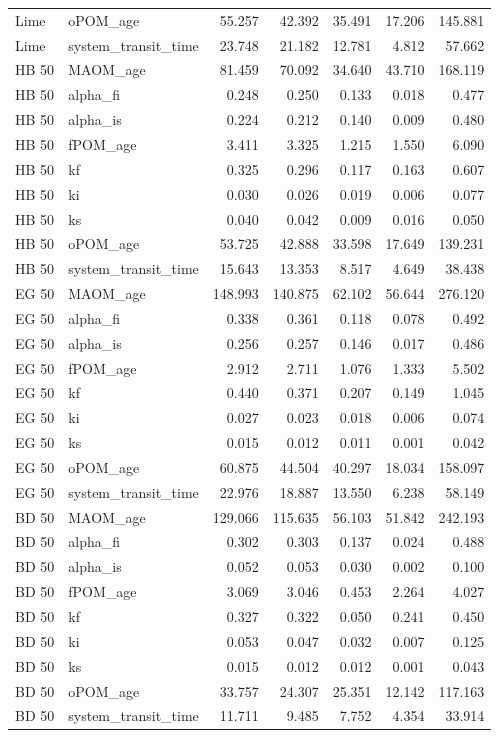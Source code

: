 \documentclass[preprint,12pt]{elsarticle}
\begin{document}
\begin{landscape}
\begin{longtable}{llrrrrr}
Lime & oPOM\_age & 55.257 & 42.392 & 35.491 & 17.206 & 145.881 \\
Lime & system\_transit\_time & 23.748 & 21.182 & 12.781 & 4.812 & 57.662 \\
HB 50 & MAOM\_age & 81.459 & 70.092 & 34.640 & 43.710 & 168.119 \\
HB 50 & alpha\_fi & 0.248 & 0.250 & 0.133 & 0.018 & 0.477 \\
HB 50 & alpha\_is & 0.224 & 0.212 & 0.140 & 0.009 & 0.480 \\
HB 50 & fPOM\_age & 3.411 & 3.325 & 1.215 & 1.550 & 6.090 \\
HB 50 & kf & 0.325 & 0.296 & 0.117 & 0.163 & 0.607 \\
HB 50 & ki & 0.030 & 0.026 & 0.019 & 0.006 & 0.077 \\
HB 50 & ks & 0.040 & 0.042 & 0.009 & 0.016 & 0.050 \\
HB 50 & oPOM\_age & 53.725 & 42.888 & 33.598 & 17.649 & 139.231 \\
HB 50 & system\_transit\_time & 15.643 & 13.353 & 8.517 & 4.649 & 38.438 \\
EG 50 & MAOM\_age & 148.993 & 140.875 & 62.102 & 56.644 & 276.120 \\
EG 50 & alpha\_fi & 0.338 & 0.361 & 0.118 & 0.078 & 0.492 \\
EG 50 & alpha\_is & 0.256 & 0.257 & 0.146 & 0.017 & 0.486 \\
EG 50 & fPOM\_age & 2.912 & 2.711 & 1.076 & 1.333 & 5.502 \\
EG 50 & kf & 0.440 & 0.371 & 0.207 & 0.149 & 1.045 \\
EG 50 & ki & 0.027 & 0.023 & 0.018 & 0.006 & 0.074 \\
EG 50 & ks & 0.015 & 0.012 & 0.011 & 0.001 & 0.042 \\
EG 50 & oPOM\_age & 60.875 & 44.504 & 40.297 & 18.034 & 158.097 \\
EG 50 & system\_transit\_time & 22.976 & 18.887 & 13.550 & 6.238 & 58.149 \\
BD 50 & MAOM\_age & 129.066 & 115.635 & 56.103 & 51.842 & 242.193 \\
BD 50 & alpha\_fi & 0.302 & 0.303 & 0.137 & 0.024 & 0.488 \\
BD 50 & alpha\_is & 0.052 & 0.053 & 0.030 & 0.002 & 0.100 \\
BD 50 & fPOM\_age & 3.069 & 3.046 & 0.453 & 2.264 & 4.027 \\
BD 50 & kf & 0.327 & 0.322 & 0.050 & 0.241 & 0.450 \\
BD 50 & ki & 0.053 & 0.047 & 0.032 & 0.007 & 0.125 \\
BD 50 & ks & 0.015 & 0.012 & 0.012 & 0.001 & 0.043 \\
BD 50 & oPOM\_age & 33.757 & 24.307 & 25.351 & 12.142 & 117.163 \\
BD 50 & system\_transit\_time & 11.711 & 9.485 & 7.752 & 4.354 & 33.914 \\
\end{longtable}


\end{landscape}
\end{document}
